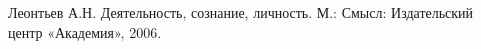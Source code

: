 \begin{thebibliography}{1}
	
	
	Леонтьев А.Н. Деятельность, сознание, личность. М.: Смысл: Издательский центр «Академия», 2006. 
	
	
	
	
	
	
	
	
	
	
	
\end{thebibliography}
